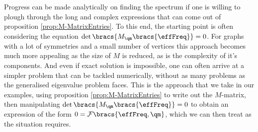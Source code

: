Progress can be made analytically on finding the spectrum if one is willing to plough through the long and complex expressions that can come out of proposition \ref{prop:M-MatrixEntries}.
To this end, the starting point is often considering the equation $\det\bracs{M_{\qm}\bracs{\effFreq}}=0$.
For graphs with a lot of symmetries and a small number of vertices this approach becomes much more appealing as the size of $M$ is reduced, as is the complexity of it's components.
And even if exact solution is impossible, one can often arrive at a simpler problem that can be tackled numerically, without as many problems as the generalised eigenvalue problem faces.
This is the approach that we take in our examples, using proposition \ref{prop:M-MatrixEntries} to write out the $M$-matrix, then manipulating $\det\bracs{M_{\qm}\bracs{\effFreq}}=0$ to obtain an expression of the form $0 = \mathcal{F}\bracs{\effFreq, \qm}$, which we can then treat as the situation requires.

